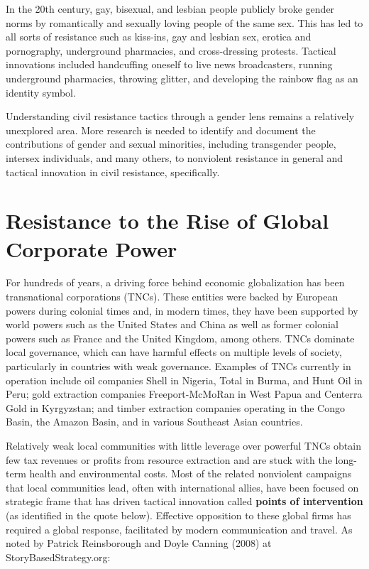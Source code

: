 \documentclass[twoside,a4paper,12pt,fleqn,openany]{extbook}
\begin{document}
In the 20th century, gay, bisexual, and lesbian people publicly broke gender norms by romantically and sexually loving people of the same sex. This has led to all sorts of resistance such as kiss-ins, gay and lesbian sex, erotica and pornography, underground pharmacies, and cross-dressing protests. Tactical innovations included handcuffing oneself to live news broadcasters, running underground pharmacies, throwing glitter, and developing the rainbow flag as an identity symbol.

Understanding civil resistance tactics through a gender lens remains a relatively unexplored area. More research is needed to identify and document the contributions of gender and sexual minorities, including transgender people, intersex individuals, and many others, to nonviolent resistance in general and tactical innovation in civil resistance, specifically.

\section*{Resistance to the Rise of Global Corporate Power}

For hundreds of years, a driving force behind economic globalization has been transnational corporations (TNCs). These entities were backed by European powers during colonial times and, in modern times, they have been supported by world powers such as the United States and China as well as former colonial powers such as France and the United Kingdom, among others. TNCs dominate local governance, which can have harmful effects on multiple levels of society, particularly in countries with weak governance. Examples of TNCs currently in operation include oil companies Shell in Nigeria, Total in Burma, and Hunt Oil in Peru; gold extraction companies Freeport-McMoRan in West Papua and Centerra Gold in Kyrgyzstan; and timber extraction companies operating in the Congo Basin, the Amazon Basin, and in various Southeast Asian countries.

Relatively weak local communities with little leverage over powerful TNCs obtain few tax revenues or profits from resource extraction and are stuck with the long-term health and environmental costs. Most of the related nonviolent campaigns that local communities lead, often with international allies, have been focused on strategic frame that has driven tactical innovation called \textbf{points of intervention} (as identified in the quote below). Effective opposition to these global firms has required a global response, facilitated by modern communication and travel. As noted by Patrick Reinsborough and Doyle Canning (2008) at StoryBasedStrategy.org:
\end{document}
